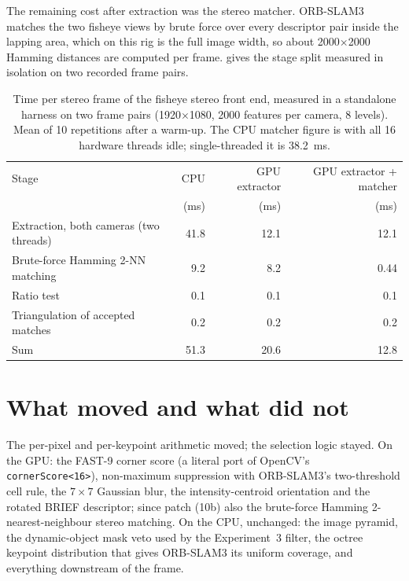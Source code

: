 \documentclass[11pt,a4paper,notitlepage]{report}
\begin{document}
The remaining cost after extraction was the stereo matcher. ORB-SLAM3
\cite{campos2021} matches the two fisheye views by brute force over every
descriptor pair inside the lapping area, which on this rig is the full image
width, so about \num{2000}\(\times\)\num{2000} Hamming distances are computed
per frame.  gives the stage split measured in isolation
on two recorded frame pairs.

\begin{table}[htbp]
\centering
\caption{Time per stereo frame of the fisheye stereo front end, measured in a
standalone harness on two  frame pairs
(\num{1920}\(\times\)\num{1080}, \num{2000} features per camera, 8 levels).
Mean of 10 repetitions after a warm-up. The CPU matcher figure is with all 16
hardware threads idle; single-threaded it is \SI{38.2}{\milli\second}.}
\label{tab:gpu-stages}
\small
\begin{tabular}{lrrr}
\toprule
Stage & CPU & GPU extractor & GPU extractor + matcher \\
 & (\si{\milli\second}) & (\si{\milli\second}) & (\si{\milli\second}) \\
\midrule
Extraction, both cameras (two threads) & 41.8 & 12.1 & 12.1 \\
Brute-force Hamming 2-NN matching       &  9.2 &  8.2 &  0.44 \\
Ratio test                              &  0.1 &  0.1 &  0.1 \\
Triangulation of accepted matches       &  0.2 &  0.2 &  0.2 \\
\midrule
Sum                                     & 51.3 & 20.6 & 12.8 \\
\bottomrule
\end{tabular}
\end{table}

\section{What moved and what did not}
\label{sec:gpu-design}

The per-pixel and per-keypoint arithmetic moved; the selection logic stayed.
On the GPU: the FAST-9 corner score (a literal port of OpenCV's
\texttt{cornerScore<16>}), non-maximum suppression with ORB-SLAM3's
two-threshold cell rule, the \(7\times7\) Gaussian blur, the intensity-centroid
orientation and the rotated BRIEF descriptor; since patch (10b) also the
brute-force Hamming 2-nearest-neighbour stereo matching. On the CPU, unchanged:
the image pyramid, the dynamic-object mask veto used by the Experiment~3
filter, the octree keypoint distribution that gives ORB-SLAM3 its uniform
coverage, and everything downstream of the frame.
\end{document}
